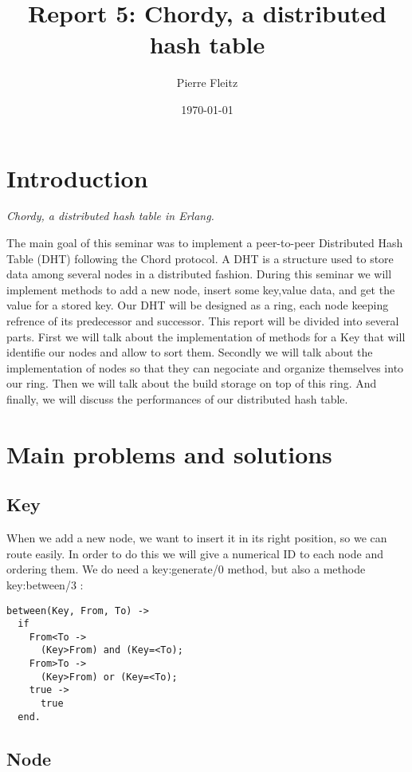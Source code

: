 \documentclass[a4paper, 11pt]{article}
\title{Report 5: Chordy, a distributed hash table}
\author{Pierre Fleitz}
\date{\today{}}
\begin{document}
\maketitle

\section{Introduction}

\textit{Chordy, a distributed hash table in Erlang.} \

The main goal of this seminar was to implement a peer-to-peer Distributed Hash Table (DHT) following the Chord protocol. A DHT is a structure used to store data among several nodes in a distributed fashion. During this seminar we will implement methods to add a new node, insert some key,value data, and get the value for a stored key.
Our DHT will be designed as a ring, each node keeping refrence of its predecessor and successor.
This report will be divided into several parts. First we will talk about the implementation of methods for a Key that will identifie our nodes and allow to sort them. Secondly we will talk about the implementation of nodes so that they can negociate and organize themselves into our ring. Then we will talk about the build storage on top of this ring. And finally, we will discuss the performances of our distributed hash table.


\section{Main problems and solutions}

\subsection{Key}
When we add a new node, we want to insert it in its right position, so we can route easily. In order to do this we will give a numerical ID to each node and ordering them.
We do need a key:generate/0 method, but also a methode key:between/3 :

\begin{verbatim}
between(Key, From, To) ->
  if
    From<To ->
      (Key>From) and (Key=<To);
    From>To ->
      (Key>From) or (Key=<To);
    true ->
      true
  end.
\end{verbatim}

\subsection{Node}
\end{document}
